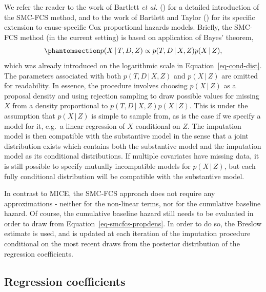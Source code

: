 \documentclass[
  letterpaper,
  paper=240mm:170mm,
  twoside=true,
  open=right,
  fontsize=10pt,
  pagesize=false,
  BCOR=15mm,
  DIV=14,
  headinclude=true,
  footinclude=false,
  headsepline=on]{scrbook}
\newcommand{\given}{\,|\,}
\begin{document}
We refer the reader to the work of Bartlett \emph{et al.}
() for a
detailed introduction of the SMC-FCS method, and to the work of Bartlett
and Taylor ()
for its specific extension to cause-specific Cox proportional hazards
models. Briefly, the SMC-FCS method (in the current setting) is based on
application of Bayes' theorem,
\begin{equation}\phantomsection\label{eq-smcfcs-propdens}{
  p(X \given T, D, Z) \propto p(T,D \given X, Z)p(X \given Z),
}\end{equation} which was already introduced on the logarithmic scale in
Equation~\ref{eq-cond-dist}. The parameters associated with both
\(p(T,D \given X, Z)\) and \(p(X \given Z)\) are omitted for
readability. In essence, the procedure involves choosing
\(p(X \given Z)\) as a proposal density and using rejection sampling to
draw possible values for missing \(X\) from a density proportional to
\(p(T,D \given X, Z)p(X \given Z)\). This is under the assumption that
\(p(X \given Z)\) is simple to sample from, as is the case if we specify
a model for it, e.g.~a linear regression of \(X\) conditional on \(Z\).
The imputation model is then compatible with the substantive model in
the sense that a joint distribution exists which contains both the
substantive model and the imputation model as its conditional
distributions. If multiple covariates have missing data, it is still
possible to specify mutually incompatible models for \(p(X \given Z)\),
but each fully conditional distribution will be compatible with the
substantive model.

In contrast to MICE, the SMC-FCS approach does not require any
approximations - neither for the non-linear terms, nor for the
cumulative baseline hazard. Of course, the cumulative baseline hazard
still needs to be evaluated in order to draw from
Equation~\ref{eq-smcfcs-propdens}. In order to do so, the Breslow
estimate is used, and is updated at each iteration of the imputation
procedure conditional on the most recent draws from the posterior
distribution of the regression coefficients.

\subsection{Regression coefficients}\label{regression-coefficients}
\end{document}

